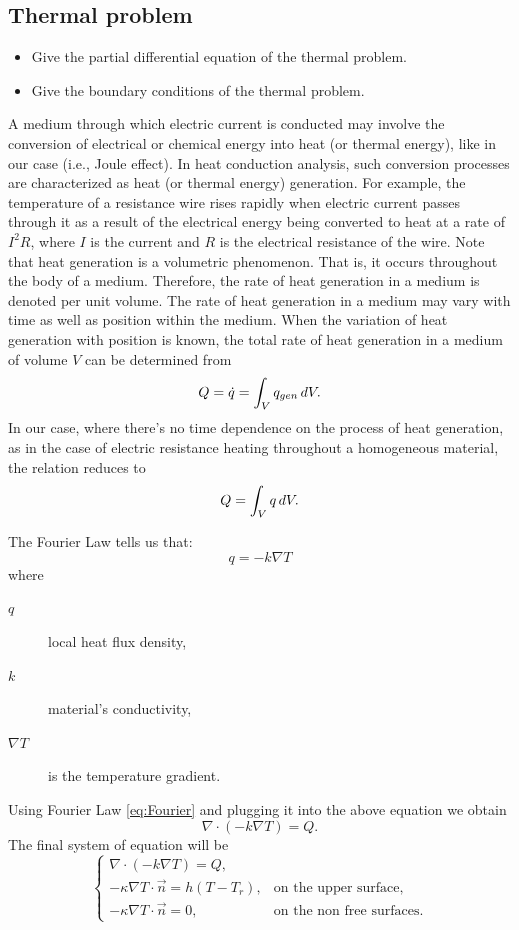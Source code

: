 \subsection{Thermal problem}
\begin{itemize}
	\item Give the partial differential equation of the thermal problem.
	\item Give the boundary conditions of the thermal problem.
\end{itemize}
A medium through which electric current is conducted may involve the conversion of electrical or chemical energy into heat (or thermal energy), like in our case (i.e., Joule effect). In heat conduction analysis, such conversion processes are characterized as heat (or thermal energy) generation.
For example, the temperature of a resistance wire rises rapidly when electric current passes through it as a result of the electrical energy being converted to heat at a rate of $ I^2R $, where $ I $ is the current and $ R $ is the electrical resistance of the wire. 
Note  that  heat  generation  is  a  volumetric  phenomenon. That  is, it  occurs throughout the body of a medium. Therefore, the rate of heat generation in a medium is denoted per unit volume. The rate of heat generation in a medium may vary with time as well as position within the medium. When the variation of heat generation with position
is known, the total rate of heat generation in a medium of volume $ V $ can be determined from
\[Q = \dot{q}=\int_V q_{gen}\mathop{}\!d V. \]
In  our case, where there's no time dependence on the process of heat  generation,  as  in  the  case  of  electric resistance heating throughout a homogeneous material, the relation reduces to 
\[Q = \int_{V}q\mathop{}\!d V. \]

The Fourier Law tells us that:
\begin{equation}
\label{eq:Fourier}
q=-k\nabla T
\end{equation}
where
\begin{description}
	\item[$ q$] local heat flux density,
	\item[$ k $] material's conductivity,
	\item[$ \nabla T $] is the temperature gradient. 
\end{description}

Using Fourier Law \eqref{eq:Fourier} and plugging it into the above equation we obtain
\begin{equation}
\nabla\cdot(-k\nabla T)=Q.
\end{equation}
The final system of equation will be
\begin{equation}
\label{problem:heat}
\begin{cases}
	\nabla\cdot(-k\nabla T)=Q, \\
	-\kappa\nabla T\cdot \vec{n}=h(T-T_r), &\text{on the upper surface},\\
	-\kappa\nabla T\cdot \vec{n}=0, &\text{on the non free surfaces}.
\end{cases}
\end{equation}


